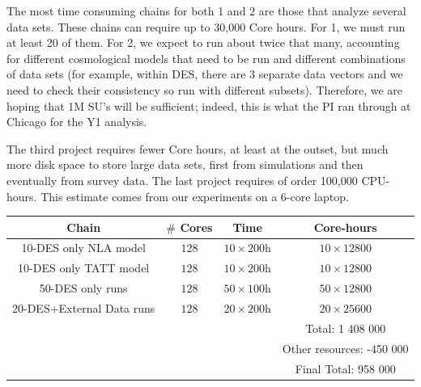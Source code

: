 \documentclass[12pt]{article}
\begin{document}
\begin{small}
The most time consuming chains for both 1 and 2 are those that analyze several data sets.%
These chains can require up to 30,000 Core hours. For 1, we must run at least 20 of them. %
For 2, we expect to run about twice that many, accounting for different cosmological models that need to be run and different combinations of data sets (for example, within DES, there are 3 separate data vectors and we need to check their consistency so run with different subsets). Therefore, we are hoping that 1M SU's will be sufficient; indeed, this is what the PI ran through at Chicago for the Y1 analysis.

The third project requires fewer Core hours, at least at the outset, but much more disk space to store large data sets, first from simulations and then eventually from survey data. The last project requires of order 100,000 CPU-hours. This estimate comes from our experiments on a 6-core laptop. 



\begin{table}[h!]
\begin{center}
\begin{tabular}{c|cc|c}
 Chain         & $\#$ Cores &  Time & Core-hours   \\ 
\hline
10-DES only NLA model & $128$ & $10\times200$h & $10\times12800$  \\ 
10-DES only TATT model & $128$ & $10\times200$h & $10\times12800$  \\  
\hline
 50-DES only runs & $128$ & $50\times100$h & $50\times12800$  \\  
 20-DES+External Data runs & $128$ & $20\times200$h & $20\times25600$  \\  
\hline
& &  & Total: 1 408 000\\
& &  & Other resources: -450 000\\
& &  & Final Total: 958 000\\
\end{tabular}



\end{center}
\end{table}
\end{small}
\end{document}

